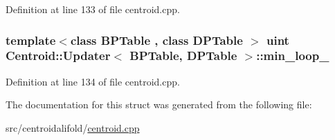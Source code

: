 Definition at line 133 of file centroid.\+cpp.

\hypertarget{struct_centroid_1_1_updater_a8de12893eea4e0759964678717585026}{
\subsubsection[{min\+\_\+loop\+\_\+}]{\setlength{\rightskip}{0pt plus 5cm}template$<$class B\+P\+Table , class D\+P\+Table $>$ {\bf uint} {\bf Centroid\+::\+Updater}$<$ {\bf B\+P\+Table}, D\+P\+Table $>$\+::min\+\_\+loop\+\_\+}}\label{struct_centroid_1_1_updater_a8de12893eea4e0759964678717585026}


Definition at line 134 of file centroid.\+cpp.



The documentation for this struct was generated from the following file\+:\begin{DoxyCompactItemize}
\item 
src/centroidalifold/\hyperlink{centroid_8cpp}{centroid.\+cpp}\end{DoxyCompactItemize}
